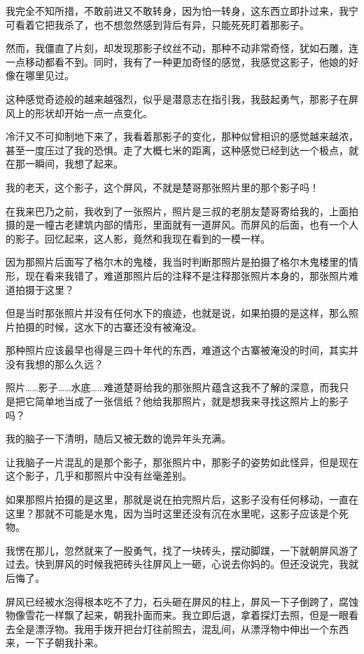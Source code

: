 我完全不知所措，不敢前进又不敢转身，因为怕一转身，这东西立即扑过来，我宁可看着它把我杀了，也不想忽然感到背后有异，只能死死盯着那影子。

然而，我僵直了片刻，却发现那影子纹丝不动，那种不动非常奇怪，犹如石雕，连一点移动都看不到。同时，我有了一种更加奇怪的感觉，我感觉这影子，他娘的好像在哪里见过。

这种感觉奇迹般的越来越强烈，似乎是潜意志在指引我，我鼓起勇气，那影子在屏风上的形状却开始一点一点变化。

冷汗又不可抑制地下来了，我看着那影子的变化，那种似曾相识的感觉越来越浓，甚至一度压过了我的恐惧。走了大概七米的距离，这种感觉已经到达一个极点，就在那一瞬间，我想了起来。

我的老天，这个影子，这个屏风，不就是楚哥那张照片里的那个影子吗！

在我来巴乃之前，我收到了一张照片，照片是三叔的老朋友楚哥寄给我的，上面拍摄的是一幢古老建筑内部的情形，里面就有一道屏风。而屏风的后面，也有一个人的影子。回忆起来，这人影，竟然和我现在看到的一模一样。

因为那照片后面写了格尔木的鬼楼，我当时判断那照片是拍摄了格尔木鬼楼里的情形，现在看来我错了，难道那照片后的注释不是注释那张照片本身的，那张照片难道拍摄于这里？

但是当时那张照片并没有任何水下的痕迹，也就是说，如果拍摄的是这样，那么照片拍摄的时候，这水下的古寨还没有被淹没。

那种照片应该最早也得是三四十年代的东西，难道这个古寨被淹没的时间，其实并没有我想的那么久远？

照片……影子……水底……难道楚哥给我的那张照片蕴含这我不了解的深意，而我只是把它简单地当成了一张信纸？他给我那照片，就是想我来寻找这照片上的影子吗？

我的脑子一下清明，随后又被无数的诡异年头充满。

让我脑子一片混乱的是那个影子，那张照片中，那影子的姿势如此怪异，但是现在这个影子，几乎和那照片中没有丝毫差别。

如果那照片拍摄的是这里，那就是说在拍完照片后，这影子没有任何移动，一直在这里？那就不可能是水鬼，因为当时这里还没有沉在水里呢，这影子应该是个死物。

我愣在那儿，忽然就来了一股勇气，找了一块砖头，摆动脚蹼，一下就朝屏风游了过去。快到屏风的时候我把砖头往屏风上一砸，心说去你妈的。但还没说完，我就后悔了。

屏风已经被水泡得根本吃不了力，石头砸在屏风的柱上，屏风一下子倒跨了，腐蚀物像雪花一样飘了起来，朝我扑面而来。我立即后退，拿着探灯去照，但是一眼看去全是漂浮物。我用手拨开把台灯往前照去，混乱间，从漂浮物中伸出一个东西来，一下子朝我扑来。

